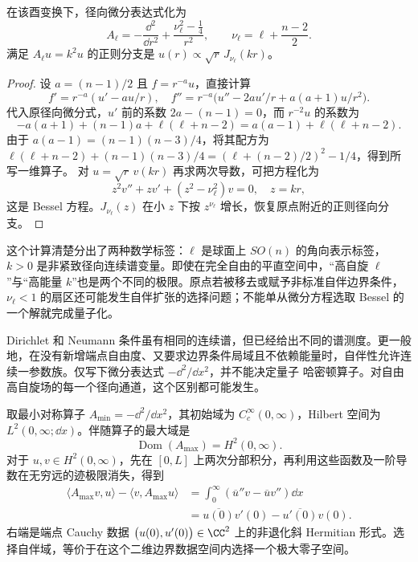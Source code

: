 \begin{proposition}\label{prop:ghs-r6-radial-bessel}
在该酉变换下，径向微分表达式化为
\begin{equation}\label{eq:ghs-r6-radial-inverse-square}
A_\ell=-\frac{\dd^2}{\dd r^2}
+\frac{\nu_\ell^2-\tfrac14}{r^2},
\qquad \nu_\ell=\ell+\frac{n-2}{2}.
\end{equation}
满足 $A_\ell u=k^2u$ 的正则分支是 $u(r)\propto\sqrt r\,J_{\nu_\ell}(kr)$。
\end{proposition}
\begin{proof}
设 $a=(n-1)/2$ 且 $f=r^{-a}u$，直接计算
\[
f'=r^{-a}(u'-au/r),\quad
f''=r^{-a}\bigl(u''-2au'/r+a(a+1)u/r^2\bigr).
\]
代入原径向微分式，$u'$ 前的系数 $2a-(n-1)=0$，而 $r^{-2}u$ 的系数为
\[
-a(a+1)+(n-1)a+\ell(\ell+n-2)
=a(a-1)+\ell(\ell+n-2).
\]
由于 $a(a-1)=(n-1)(n-3)/4$，将其配方为
$\ell(\ell+n-2)+(n-1)(n-3)/4=(\ell+(n-2)/2)^2-1/4$，得到所写一维算子。
对 $u=\sqrt r\,v(kr)$ 再求两次导数，可把方程化为
\[
z^2v''+zv'+(z^2-\nu_\ell^2)v=0,\quad z=kr,
\]
这是 Bessel 方程。$J_{\nu_\ell}(z)$ 在小 $z$ 下按 $z^{\nu_\ell}$ 增长，恢复原点附近的正则径向分支。
\end{proof}

这个计算清楚分出了两种数学标签：$\ell$ 是球面上 $SO(n)$ 的角向表示标签，$k>0$ 是非紧致径向连续谱变量。即使在完全自由的平直空间中，“高自旋 $\ell$”与“高能量 $k$”也是两个不同的极限。原点若被移去或赋予非标准自伴边界条件，$\nu_\ell<1$ 的扇区还可能发生自伴扩张的选择问题；不能单从微分方程选取 Bessel 的一个解就完成量子化。

Dirichlet 和 Neumann 条件虽有相同的连续谱，但已经给出不同的谱测度。更一般地，在没有新增端点自由度、又要求边界条件局域且不依赖能量时，自伴性允许连续一参数族。仅写下微分表达式 $-\dd^2/\dd x^2$，并不能决定量子 哈密顿算子。对自由高自旋场的每一个径向通道，这个区别都可能发生。

取最小对称算子 $A_{\min}=-\dd^2/\dd x^2$，其初始域为 $C_c^\infty(0,\infty)$，Hilbert 空间为 $L^2(0,\infty;\dd x)$。伴随算子的最大域是
\[
\operatorname{Dom}(A_{\max})=H^2(0,\infty).
\]
对于 $u,v\in H^2(0,\infty)$，先在 $[0,L]$ 上两次分部积分，再利用这些函数及一阶导数在无穷远的迹极限消失，得到
\begin{align*}
 \langle A_{\max}v, u\rangle-\langle v, A_{\max}u\rangle
 &=\int_0^\infty(\overline{u}''v-\overline{u}v'')\dd x\\
 &=\overline{u(0)}v'(0)-\overline{u'(0)}v(0).
\end{align*}
右端是端点 Cauchy 数据 $\bigl(u(0),u'(0)\bigr)\in\CC^2$ 上的非退化斜 Hermitian 形式。选择自伴域，等价于在这个二维边界数据空间内选择一个极大零子空间。

